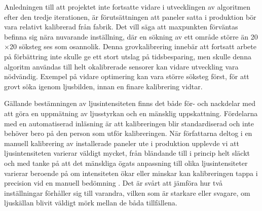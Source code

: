         Anledningen till att projektet inte fortsatte vidare i utvecklingen av algoritmen efter den tredje iterationen, är förutsättningen att paneler satta i produktion bör vara relativt kalibrerad från fabrik. Det vill säga att maxpunkten förväntas befinna sig nära nuvarande inställning, där en sökning av ett område större än 20$\times$20 söksteg ses som osannolik. Denna grovkalibrering innebär att fortsatt arbete på förbättring inte skulle ge ett stort utslag på tidsbesparing, men skulle denna algoritm användas till helt okalibrerade sensorer kan vidare utveckling vara nödvändig. Exempel på vidare optimering kan vara större söksteg först, för att grovt söka igenom ljusbilden, innan en finare kalibrering vidtar.\bigskip

        Gällande bestämningen av ljusintensiteten finns det både för- och nackdelar med att göra en uppmätning av ljusstyrkan och en mänsklig uppskattning. Fördelarna med en automatiserad inläsning är att kalibreringen blir standardiserad och inte behöver bero på den person som utför kalibreringen. När författarna deltog i en manuell kalibrering av installerade paneler ute i produktion upplevde vi att ljusintensiteten varierar väldigt mycket, från bländande till i princip helt släckt och med tanke på att det mänskliga ögats anpassning till olika ljusintensiteter varierar beroende på om intensiteten ökar eller minskar kan kalibreringen tappa i precision vid en manuell bedömning \cite[s.~273]{aot}. Det är svårt att jämföra hur två inställningar förhåller sig till varandra, vilken som är starkare eller svagare, om ljuskällan blivit väldigt mörk mellan de båda tillfällena.\bigskip 


